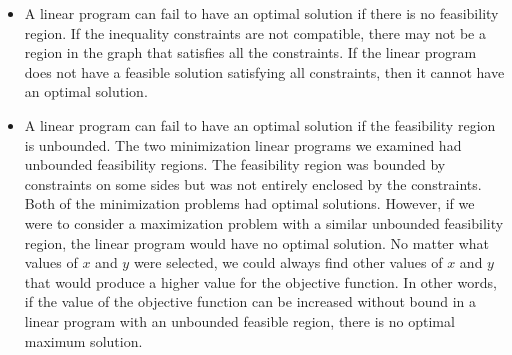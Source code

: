 \begin{itemize}
    \item A linear program can fail to have an optimal solution if there is no feasibility region. If the inequality constraints are not compatible, there may not be a region in the graph that satisfies all the constraints. If the linear program does not have a feasible solution satisfying all constraints, then it cannot have an optimal solution.

    \item A linear program can fail to have an optimal solution if the feasibility region is unbounded. The two minimization linear programs we examined had unbounded feasibility regions. The feasibility region was bounded by constraints on some sides but was not entirely enclosed by the constraints. Both of the minimization problems had optimal solutions. However, if we were to consider a maximization problem with a similar unbounded feasibility region, the linear program would have no optimal solution. No matter what values of \(x\) and \(y\) were selected, we could always find other values of \(x\) and \(y\) that would produce a higher value for the objective function. In other words, if the value of the objective function can be increased without bound in a linear program with an unbounded feasible region, there is no optimal maximum solution.
\end{itemize}


